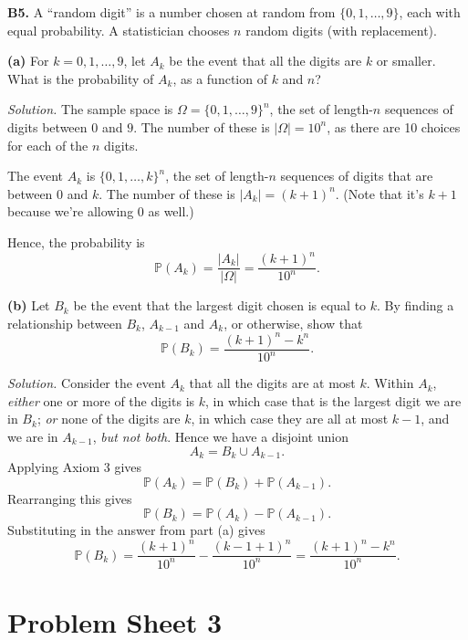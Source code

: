 \documentclass[
  a4paper,
]{book}
\theoremstyle{definition}
\theoremstyle{definition}
\theoremstyle{definition}
\theoremstyle{definition}
\theoremstyle{remark}
\begin{document}
\textbf{B5.} A ``random digit'' is a number chosen at random from \(\{0, 1, \dots, 9\}\), each with equal probability. A statistician chooses \(n\) random digits (with replacement).

\textbf{(a)} For \(k = 0, 1, \dots, 9\), let \(A_k\) be the event that all the digits are \(k\) or smaller. What is the probability of \(A_k\), as a function of \(k\) and \(n\)?

\begin{myanswers}
\emph{Solution.}
The sample space is \(\Omega = \{0,1,\dots,9\}^n\), the set of length-\(n\) sequences of digits between \(0\) and \(9\). The number of these is \(|\Omega| = 10^n\), as there are 10 choices for each of the \(n\) digits.

The event \(A_k\) is \(\{0,1,\dots,k\}^n\), the set of length-\(n\) sequences of digits that are between \(0\) and \(k\). The number of these is \(|A_k| = (k+1)^n\). (Note that it's \(k+1\) because we're allowing 0 as well.)

Hence, the probability is
\[ \mathbb P(A_k) = \frac{|A_k|}{|\Omega|} = \frac{(k+1)^n}{10^n} . \]

\end{myanswers}

\textbf{(b)} Let \(B_k\) be the event that the largest digit chosen is equal to \(k\). By finding a relationship between \(B_k\), \(A_{k-1}\) and \(A_k\), or otherwise, show that
\[ \mathbb P(B_k) = \frac{(k+1)^n - k^n}{10^n} . \]

\begin{myanswers}
\emph{Solution.}
Consider the event \(A_k\) that all the digits are at most \(k\). Within \(A_k\), \emph{either} one or more of the digits is \(k\), in which case that is the largest digit we are in \(B_k\); \emph{or} none of the digits are \(k\), in which case they are all at most \(k-1\), and we are in \(A_{k-1}\), \emph{but not both}. Hence we have a disjoint union
\[ A_k = B_k \cup A_{k-1} . \]
Applying Axiom 3 gives
\[ \mathbb P(A_k) = \mathbb P(B_k) + \mathbb P(A_{k-1}) . \]
Rearranging this gives
\[ \mathbb P(B_k) = \mathbb P(A_k) - \mathbb P(A_{k-1}) . \]
Substituting in the answer from part (a) gives
\[\mathbb P(B_k) = \frac{(k+1)^n}{10^n} - \frac{(k-1+1)^n}{10^n} = \frac{(k+1)^n - k^n}{10^n} . \]

\end{myanswers}

\hypertarget{P3-solutions}{%
\section*{Problem Sheet 3}\label{P3-solutions}}
\end{document}
